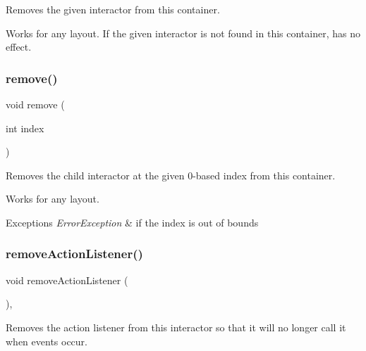 Removes the given interactor from this container. 

Works for any layout. If the given interactor is not found in this container, has no effect. \mbox{\label{classGContainer_a2ad1aa316f278b2e9fa8121504749652}} 
\subsubsection{\texorpdfstring{remove()}{remove()}\hspace{0.1cm}{\footnotesize\ttfamily [3/3]}}
{\footnotesize\ttfamily void remove (\begin{DoxyParamCaption}\item[{int}]{index }\end{DoxyParamCaption})\hspace{0.3cm}{\ttfamily [virtual]}}



Removes the child interactor at the given 0-\/based index from this container. 

Works for any layout. 
\begin{DoxyExceptions}{Exceptions}
{\em Error\+Exception} & if the index is out of bounds \\
\hline
\end{DoxyExceptions}
\mbox{\label{classGInteractor_ab7fe7a876367b87cf7202f947f1d05e4}} 
\subsubsection{\texorpdfstring{remove\+Action\+Listener()}{removeActionListener()}}
{\footnotesize\ttfamily void remove\+Action\+Listener (\begin{DoxyParamCaption}{ }\end{DoxyParamCaption})\hspace{0.3cm}{\ttfamily [virtual]}, {\ttfamily [inherited]}}



Removes the action listener from this interactor so that it will no longer call it when events occur. 

\mbox{\label{classGInteractor_ad39d0325cde6b97ebda4b9d7787c633b}} 
